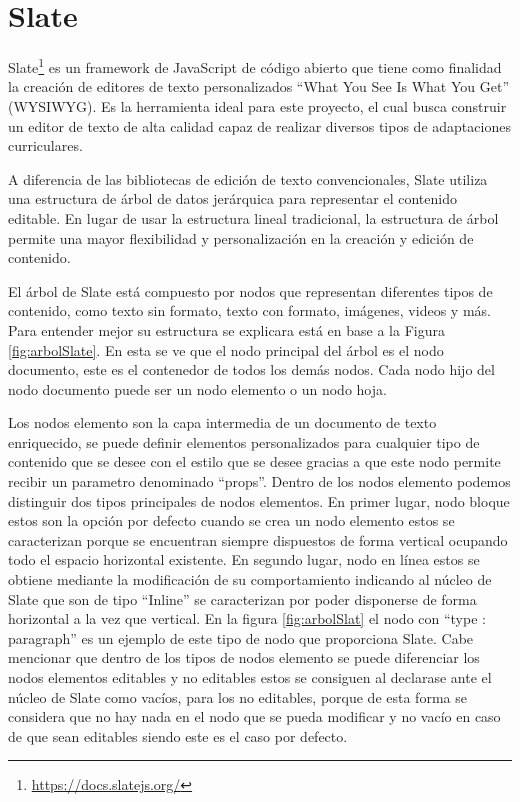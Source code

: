 
\section{Slate}\label{sec:Slate}
Slate\footnote{\url{https://docs.slatejs.org/}} es un framework de JavaScript de código abierto que tiene como finalidad la creación de editores de texto personalizados ``What You See Is What You Get'' (WYSIWYG). Es la herramienta ideal para este proyecto, el cual busca construir un editor de texto de alta calidad capaz de realizar diversos tipos de adaptaciones curriculares.

A diferencia de las bibliotecas de edición de texto convencionales, Slate utiliza una estructura de árbol de datos jerárquica para representar el contenido editable. En lugar de usar la estructura lineal tradicional, la estructura de árbol permite una mayor flexibilidad y personalización en la creación y edición de contenido.

El árbol de Slate está compuesto por nodos que representan diferentes tipos de contenido, como texto sin formato, texto con formato, imágenes, videos y más. Para entender mejor su estructura se explicara está en base a la Figura \ref{fig:arbolSlate}. En esta se ve que el nodo principal del árbol es el nodo documento, este es el contenedor de todos los demás nodos. Cada nodo hijo del nodo documento puede ser un nodo elemento o un nodo hoja.

Los nodos elemento son la capa intermedia de un documento de texto enriquecido, se puede definir elementos personalizados para cualquier tipo de contenido que se desee con el estilo que se desee gracias a que este nodo permite recibir un parametro denominado ``props''. Dentro de los nodos elemento podemos distinguir dos tipos principales de nodos elementos. En primer lugar, nodo bloque estos son la opción por defecto cuando se crea un nodo elemento estos se caracterizan porque se encuentran siempre dispuestos de forma vertical ocupando todo el espacio horizontal existente. En segundo lugar, nodo en línea estos se obtiene mediante la modificación de su comportamiento indicando al núcleo de Slate que son de tipo ``Inline'' se caracterizan por poder disponerse de forma horizontal a la vez que vertical. En la figura \ref{fig:arbolSlat}  el nodo con ``type : paragraph'' es un ejemplo de este tipo de nodo que proporciona Slate. Cabe mencionar que dentro de los tipos de nodos elemento se puede diferenciar los nodos elementos editables y no editables estos se consiguen al declarase ante el núcleo de Slate como vacíos, para los no editables, porque de esta forma se considera que no hay nada en el nodo que se pueda modificar y no vacío en caso de que sean editables siendo este es el caso por defecto.

